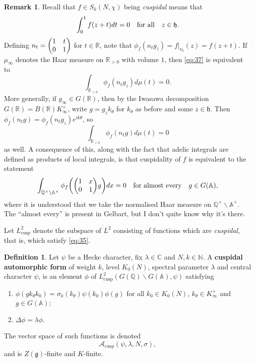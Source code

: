 \documentclass[11pt]{report}
\let\mbb\mathbb
\let\mc\mathcal
\let\mf\mathfrak
\newcommand{\1}{\mathbbm 1}
\newcommand{\N}{\mathbb{N}}
\newcommand{\Q}{\mathbb{Q}}
\newcommand{\R}{\mathbb{R}}
\newcommand{\C}{\mathbb{C}}
\newcommand{\A}{\mbb A}
\newcommand{\bs}{\backslash}
\DeclareMathOperator{\cusp}{cusp}
\theoremstyle{plain}
\newcounter{ex}
\theoremstyle{definition}
\newtheorem{mydef}[thm]{Definition}
\newtheorem{remark}[thm]{Remark}
\theoremstyle{remark}
\numberwithin{equation}{section}
\begin{document}
\begin{remark}
  Recall that $f \in S_{k}(N,\chi)$ being \emph{cuspidal} means that
  \begin{equation}
    \label{eq:37}
    \int_{0}^{1} f(z+t) dt = 0 \qq{for all} z \in \mf h.
  \end{equation}
  Defining $n_{t} = \mqty(1 & t \\ 0 & 1)$ for $t \in \R$, note that
  $\phi_{f}(n_{t}g_{z}) = f|_{n_{t}}(z) = f(z+t)$. If $\mu_{\infty}$ denotes the
  Haar measure on $\R_{>0}$ with volume $1$, then \cref{eq:37} is
  equivalent to
  \begin{equation}
    \label{eq:39}
    \int_{\R_{>0}}\phi_{f}(n_{t}g_{z})d\mu(t) = 0.
  \end{equation}
  More generally, if $g_{\infty} \in G(\R)$, then by the Iwasawa
  decomposition $G(\R) = B(\R)K_{\infty}^{+}$, write
  $g = g_{z}k_{\theta}$ for $k_{\theta}$ as before and some
  $z \in \mf h$. Then $\phi_{f}(n_{t}g) = \phi_{f}(n_{t}g_{z})e^{ik\theta}$, so 
\begin{equation}
  \label{eq:40}
\int_{\R_{>0}}\phi_{f}(n_{t}g)d\mu(t) = 0
\end{equation}
as well. A consequence of this, along with the fact that adelic
integrals are defined as products of local integrals, is that
cuspidality of $f$ is equivalent to the statement
  \begin{equation}
    \label{eq:36}
    \int_{\Q^{\times}\bs \A^{\times}} \phi_{f}\qty(\mqty(1  & x \\ 0 & 1)g)dx = 0
    \qq{for almost every} g \in G(\A),
  \end{equation}
  where it is understood that we take the normalised Haar measure on
  $\Q^{\times}\bs \A^{\times}$. The ``almost every'' is present in Gelbart, but
  I don't quite know why it's there.
\end{remark}

Let $L^{2}_{\cusp}$ denote the subspace of $L^{2}$ consisting of
functions which are \emph{cuspidal}, that is, which satisfy \cref{eq:35}.

\begin{mydef}
  Let $\psi$ be a Hecke character, fix $\lambda \in \C$ and $N,k \in \N$. 
  A \textbf{cuspidal automorphic form} of weight $k$, level $K_{0}(N)$, spectral
  parameter $\lambda$ and central character $\psi$, is an element $\phi$ of
  $L^{2}_{\cusp}(G(\Q)\bs G(\A),\psi)$ satisfying
\begin{enumerate}
\item $\phi(gk_{\theta}k_{0}) = \sigma_{k}(k_{\theta})\psi(k_{0})\phi(g)$ for all $k_{0} \in
  K_{0}(N)$, $k_{\theta} \in K_{\infty}^{+}$ and $g \in G(\A)$;
\item $\Delta\phi = \lambda\phi$.
\end{enumerate}
The vector space of such functions is denoted
  \begin{equation}
    \label{eq:21}
\mc A_{\cusp}(\psi,\lambda,N,\sigma),
\end{equation}
and is $Z(\mf g)$-finite and $K$-finite. 
\end{mydef}
\end{document}
